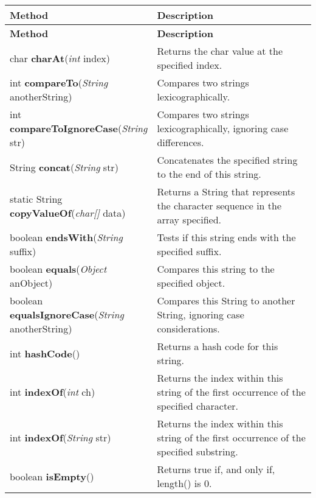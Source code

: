 \documentclass[main]{subfiles}
\begin{document}
\scriptsize
\begin{longtable}{p{0.4\linewidth} p{0.6\linewidth}}
\hline \textbf{Method} & \textbf{Description}\\ \hline
\endfirsthead

\hline \textbf{Method} & \textbf{Description}\\ \hline\hline
\endhead

char \textbf{charAt}(\textit{int} index) 
& Returns the char value at the specified index.\\

int  \textbf{compareTo}(\textit{String} anotherString) 
& Compares two strings lexicographically.\\

int  \textbf{compareToIgnoreCase}(\textit{String} str) 
& Compares two strings lexicographically, ignoring case differences.\\

String  \textbf{concat}(\textit{String} str) 
& Concatenates the specified string to the end of this string.\\

static String  \textbf{copyValueOf}(\textit{char[]} data) 
& Returns a String that represents the character sequence in the array specified.\\

boolean  \textbf{endsWith}(\textit{String} suffix) 
& Tests if this string ends with the specified suffix.\\

boolean  \textbf{equals}(\textit{Object} anObject) 
& Compares this string to the specified object.\\

boolean  \textbf{equalsIgnoreCase}(\textit{String} anotherString) 
& Compares this String to another String, ignoring case considerations.\\

int  \textbf{hashCode}() 
& Returns a hash code for this string.\\

int  \textbf{indexOf}(\textit{int} ch) 
& Returns the index within this string of the first occurrence of the specified character.\\

int  \textbf{indexOf}(\textit{String} str) 
& Returns the index within this string of the first occurrence of the specified substring.\\

boolean  \textbf{isEmpty}() 
& Returns true if, and only if, length() is 0.\\


\end{longtable}
\end{document}
